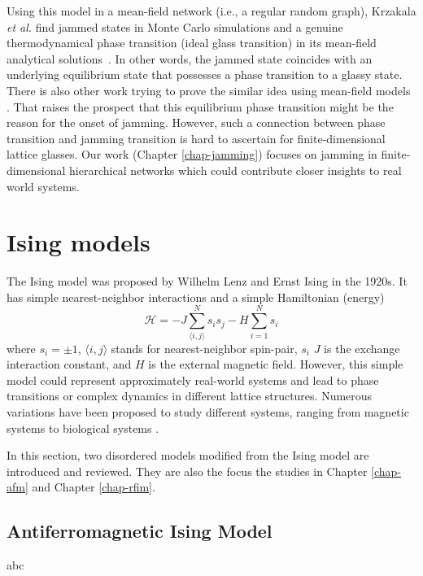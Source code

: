 Using this model in a mean-field network 
(i.e., a regular random graph), Krzakala \textit{et al.} find
jammed states in Monte Carlo simulations and a genuine thermodynamical
phase transition (ideal glass transition) in its mean-field analytical
solutions~\cite{Krzakala2008}. In other words, the jammed state coincides
with an underlying equilibrium state that possesses a phase transition
to a glassy state. There is also other work trying to prove the similar idea using mean-field models \cite{Rivoire03,berthier2011theory, Parisi2010}. That raises the prospect that this equilibrium phase transition might be the reason for the onset of jamming. However, such a connection between phase transition and jamming transition is hard to ascertain for finite-dimensional lattice glasses. Our work (Chapter \ref{chap-jamming}) focuses on jamming in finite-dimensional hierarchical networks which could contribute closer insights to real world systems.

\section{Ising models}
The Ising model was proposed by Wilhelm Lenz and Ernst Ising \cite{ising1925contribution, brush1967history} in the 1920s. It has simple nearest-neighbor interactions and a simple Hamiltonian (energy)
\begin{equation}
\mathcal{H}=-J \sum_{\langle i, j\rangle}^N s_i s_j - H \sum_{i=1}^N s_i
\label{eq:intro-ising}
\end{equation}
where $s_i=\pm1$, $\langle i, j\rangle$ stands for nearest-neighbor spin-pair, $s_i$ $J$ is the exchange interaction constant, and $H$ is the external magnetic field.
However, this simple model could represent approximately real-world systems and lead to phase transitions \cite{onsager1944} or complex dynamics \cite{fredrickson1984kinetic} in different lattice structures. 
Numerous variations have been proposed to study different systems, ranging from magnetic systems \cite{blundell2001magnetism} to biological systems \cite{hopfield1982neural}.

In this section, two disordered models modified from the Ising model are introduced and reviewed. They are also the focus the studies in Chapter \ref{chap-afm} and Chapter \ref{chap-rfim}.
\subsection{Antiferromagnetic Ising Model}
\label{sec:intro-afm}
abc

